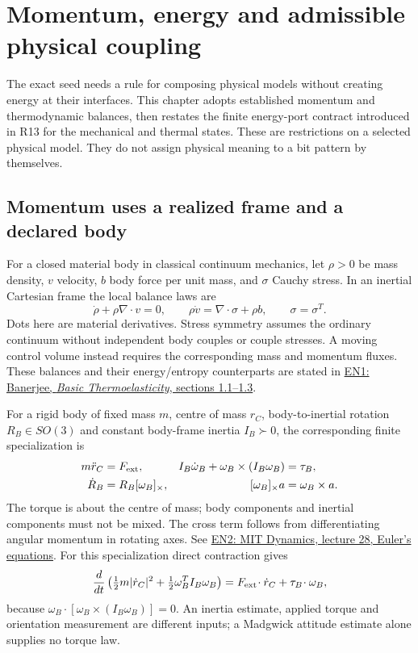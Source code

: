 \section{Momentum, energy and admissible physical coupling}
\label{sec:r13-energy}
The exact seed needs a rule for composing physical models without creating
energy at their interfaces. This chapter adopts established momentum and thermodynamic
balances, then restates the finite energy-port contract introduced in R13 for the
mechanical and thermal states. These are restrictions on a selected physical
model. They do not assign physical meaning to a bit pattern by themselves.

\subsection{Momentum uses a realized frame and a declared body}
For a closed material body in classical continuum mechanics, let $\rho>0$
be mass density, $v$ velocity, $b$ body force per unit mass, and $\sigma$
Cauchy stress. In an inertial Cartesian frame the local balance laws are
\begin{equation}
 \dot\rho+\rho\nabla\!\cdot v=0,\qquad
 \rho\dot v=\nabla\!\cdot\sigma+\rho b,\qquad \sigma=\sigma^T.
 \label{eq:r13-momentum}
\end{equation}
Dots here are material derivatives. Stress symmetry assumes the ordinary
continuum without independent body couples or couple stresses. A moving
control volume instead requires the corresponding mass and momentum fluxes.
These balances and their energy/entropy counterparts are stated in
\href{https://www.eng.utah.edu/~banerjee/Notes/ThermoElastic.pdf}
{EN1: Banerjee, \emph{Basic Thermoelasticity}, sections 1.1--1.3}.

For a rigid body of fixed mass $m$, centre of mass $r_C$, body-to-inertial
rotation $R_B\in SO(3)$ and constant body-frame inertia $I_B\succ0$,
the corresponding finite specialization is
\begin{align}
 m\ddot r_C&=F_{\rm ext},&
 I_B\dot\omega_B+\omega_B\times(I_B\omega_B)&=\tau_B,\\
 \dot R_B&=R_B[\omega_B]_\times,&
 [\omega_B]_\times a&=\omega_B\times a .
 \label{eq:r13-euler}
\end{align}
The torque is about the centre of mass; body components and inertial
components must not be mixed. The cross term follows from differentiating
angular momentum in rotating axes. See
\href{https://ocw.mit.edu/courses/16-07-dynamics-fall-2009/5e1d8699338146e5127080b880b906d6_MIT16_07F09_Lec28.pdf}
{EN2: MIT Dynamics, lecture 28, Euler's equations}.
For this specialization direct contraction gives
\begin{equation}
 \frac{d}{dt}\left(\tfrac12m|\dot r_C|^2+
                 \tfrac12\omega_B^TI_B\omega_B\right)
   =F_{\rm ext}\!\cdot\dot r_C+\tau_B\!\cdot\omega_B,
 \label{eq:r13-rigid-power}
\end{equation}
because $\omega_B\cdot[\omega_B\times(I_B\omega_B)]=0$.
An inertia estimate, applied torque and orientation measurement are different
inputs; a Madgwick attitude estimate alone supplies no torque law.

